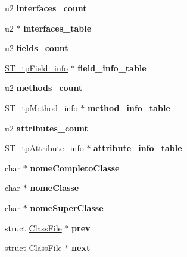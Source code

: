 \begin{DoxyCompactItemize}
\item 
\mbox{\label{structClassFile_a337fcb7da33d1b64631441115c7de305}} 
u2 {\bfseries interfaces\+\_\+count}
\item 
\mbox{\label{structClassFile_aad249ffbef9487bd5b650fd80e955c7c}} 
u2 $\ast$ {\bfseries interfaces\+\_\+table}
\item 
\mbox{\label{structClassFile_acea207ee523fbc16611d3cf436c390e0}} 
u2 {\bfseries fields\+\_\+count}
\item 
\mbox{\label{structClassFile_abd45c68c30a90e1edd92c7f399ecc872}} 
\mbox{\hyperlink{structures_8h_abff2812b91e543d80445931e2e81c1cf}{S\+T\+\_\+tp\+Field\+\_\+info}} $\ast$ {\bfseries field\+\_\+info\+\_\+table}
\item 
\mbox{\label{structClassFile_aacfb45d4af64216324b1ae5269c870d5}} 
u2 {\bfseries methods\+\_\+count}
\item 
\mbox{\label{structClassFile_a6a52b04d70c50d9bc7dee3318425acc6}} 
\mbox{\hyperlink{structures_8h_a39bc7f27824c19378efe14999e0623c8}{S\+T\+\_\+tp\+Method\+\_\+info}} $\ast$ {\bfseries method\+\_\+info\+\_\+table}
\item 
\mbox{\label{structClassFile_a633c696fbe08e7e7906b2ab1e52f3d1b}} 
u2 {\bfseries attributes\+\_\+count}
\item 
\mbox{\label{structClassFile_a5b0d05ebaa8e44601acc2a82f6a78f20}} 
\mbox{\hyperlink{structures_8h_a4ad50728b2ffc8af625f1237e03bc9e0}{S\+T\+\_\+tp\+Attribute\+\_\+info}} $\ast$ {\bfseries attribute\+\_\+info\+\_\+table}
\item 
\mbox{\label{structClassFile_a87f6714858aefad489c15a7d2312b2ae}} 
char $\ast$ {\bfseries nome\+Completo\+Classe}
\item 
\mbox{\label{structClassFile_a3f2b03f6be2a1436b84578f5b8549550}} 
char $\ast$ {\bfseries nome\+Classe}
\item 
\mbox{\label{structClassFile_a4e44479f65cb82a5547ad38ccb4901b4}} 
char $\ast$ {\bfseries nome\+Super\+Classe}
\item 
\mbox{\label{structClassFile_a8c930c54758cf6993916ea7142d1068b}} 
struct \mbox{\hyperlink{structClassFile}{Class\+File}} $\ast$ {\bfseries prev}
\item 
\mbox{\label{structClassFile_ab01d0c9d7e375959a8c8903d9536104c}} 
struct \mbox{\hyperlink{structClassFile}{Class\+File}} $\ast$ {\bfseries next}
\end{DoxyCompactItemize}


